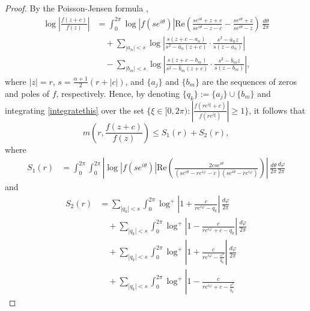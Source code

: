 \documentclass{amsart}
\theoremstyle{definition}
\numberwithin{equation}{section}
\numberwithin{theorem}{section}
\begin{document}
\begin{proof} By the Poisson-Jensen
formula \cite[Theorem 1.1]{hayman:64},
    \begin{equation}\label{integratethis}
    \begin{split}
    \log \left|\frac{f(z+c)}{f(z)}\right| &= \int_0^{2\pi}
    \log|f(se^{i\theta})|\textrm{Re}\left(\frac{se^{i\theta}+z+c}{se^{i\theta}-z-c}-
    \frac{se^{i\theta}+z}{se^{i\theta}-z}\right)\,\frac{d\theta}{2\pi}\\
    &\quad  + \sum_{|a_n|<s} \log \left|\frac{s(z+c-a_n)}{s^2-\bar a_n(z+c)}\cdot\frac{s^2-
    \bar    a_n z}{s(z-a_n)}\right| \\
    &\quad  - \sum_{|b_m|<s} \log \left|\frac{s(z+c-b_m)}{s^2-\bar b_m(z+c)}\cdot\frac{s^2-
    \bar    b_m z}{s(z-b_m)}\right|,
    \end{split}
    \end{equation}
where $|z|=r$, $s=\frac{\alpha+1}{2}(r+|c|)$, and $\{a_j\}$ and
$\{b_m\}$ are the sequences of zeros and poles of $f$,
respectively. Hence, by denoting $\{q_k\}:=\{a_j\}\cup\{b_m\}$ and
integrating \eqref{integratethis} over the set
$\{\xi\in[0,2\pi):
\left|\frac{f(re^{i\xi}+c)}{f(re^{i\xi})}\right|\geq 1\}$,
it follows that
    \begin{equation}\label{s1s2}
    m\left(r,\frac{f(z+c)}{f(z)}\right) \leq
     S_1(r)+S_2(r),
     \end{equation}
where
    \begin{equation}\label{S1prev}
    \begin{split}
    S_1(r) &= \int_0^{2\pi} \int_0^{2\pi}
    \left|\log|f(se^{i\theta})|\textrm{Re}\left(\frac{2c se^{i\theta}}{(se^{i\theta}-re^{i\varphi}-c)(se^{i\theta}-
    re^{i\varphi})}\right)\right|\,\frac{d\theta}{2\pi}\frac{d\varphi}{2\pi}
    \end{split}
    \end{equation}
and
    \begin{equation*}
    \begin{split}
    S_2(r) &= \sum_{|q_k|<s}
    \int_0^{2\pi}\log^{+}\left|1+\frac{c}{re^{i\varphi}-q_k}\right| \,\frac{d\varphi}{2\pi}
     \\
    & \quad +  \sum_{|q_k|<s}\int_0^{2\pi}\log^{+}\left|1-\frac{c}{re^{i\varphi}+c-q_k}\right|
    \,\frac{d\varphi}{2\pi}
    \\
    &\quad+ \sum_{|q_k|<s}  \int_0^{2\pi}\log^{+}\left|1+\frac{c}{re^{i\varphi}-\frac{s^2}{\bar q_k}
    }\right| \,\frac{d\varphi}{2\pi}\\
    & \quad+   \sum_{|q_k|<s} \int_0^{2\pi}\log^{+}\left|1-\frac{c}{re^{i\varphi}+c-\frac{s^2}{\bar q_k}
}
\end{split}
\end{equation*}
\end{proof}
\end{document}
